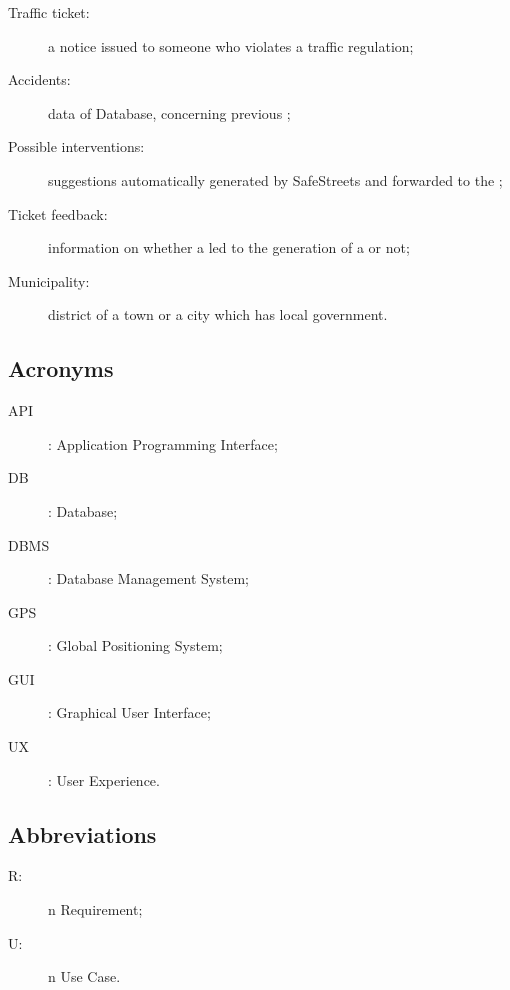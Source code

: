 \documentclass[../../DD.tex]{subfiles}
\begin{document}
\begin{description}
	\item[Traffic ticket:] a notice issued to someone who violates a traffic regulation;
	\item[Accidents:] data of  Database, concerning previous ;
	\item[Possible interventions:] suggestions automatically generated by SafeStreets and forwarded to the ;
	\item[Ticket feedback:] information on whether a  led to the generation of a  or not;
	\item[Municipality:] district of a town or a city which has local government.
\end{description}

\subsection{Acronyms\label{sect:1.3.2}}
\begin{description}
		\item[API]: Application Programming Interface;
		\item[DB]: Database;
		\item[DBMS]: Database Management System;
		\item[GPS]: Global Positioning System;
		\item[GUI]: Graphical User Interface;
		\item[UX]: User Experience.
\end{description}

\subsection{Abbreviations\label{sect:1.3.3}}
\begin{description}
	\item[R:]n Requirement;
	\item[U:]n Use Case.
\end{description}
\end{document}
